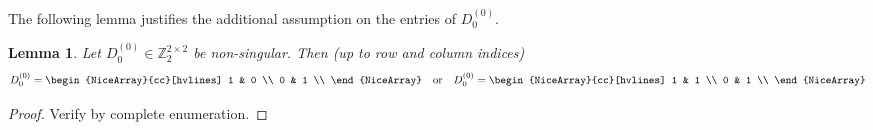 \documentclass{article}
\newtheorem{lemma}{Lemma}
\theoremstyle{definition}
\begin{document}
The following lemma justifies the additional assumption on the entries of $D_{0}^{(0)}$.

\begin{lemma}\label{lem:matrix_z2_2_2_rank_2}
    Let $D_{0}^{(0)} \in \mathbb{Z}_{2}^{2 \times 2}$ be non-singular. Then (up to row and column indices)
    \[
        D_{0}^{(0)} = \begin{NiceArray}{cc}[hvlines] 1 & 0 \\ 0 & 1 \\ \end{NiceArray}
        \quad \text{or} \quad
        D_{0}^{(0)} = \begin{NiceArray}{cc}[hvlines] 1 & 1 \\ 0 & 1 \\ \end{NiceArray}
    \]
\end{lemma}

\begin{proof}
    Verify by complete enumeration.
\end{proof}
\end{document}
